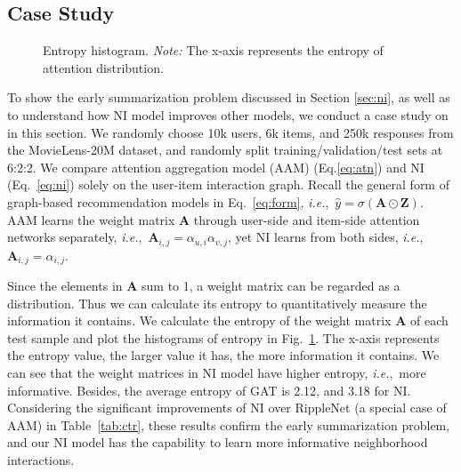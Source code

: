 \documentclass[sigconf]{acmart}
\newcommand{\ie}{\emph{i.e.},~}
\begin{document}
\subsection{Case Study}\label{sec:cs}
\begin{figure}
    \caption{Entropy histogram. \emph{Note:} The x-axis represents the entropy of attention distribution.}
    \label{fig:hist}
\end{figure}


To show the early summarization problem discussed in Section \ref{sec:ni}, as well as to understand how NI model improves other models, 
we conduct a case study on in this section. We randomly choose 10k users, 6k items, and 250k responses from the MovieLens-20M dataset, and randomly split training/validation/test sets at 6:2:2. 
We compare attention aggregation model (AAM) (Eq.\eqref{eq:atn}) and NI (Eq.~\eqref{eq:ni}) solely on the user-item interaction graph. Recall the general form of graph-based recommendation models in Eq.~\eqref{eq:form}, \ie $\hat{y} = \sigma(\mathbf{A} \odot \mathbf{Z})$. 
AAM learns the weight matrix $\mathbf{A}$ through user-side and item-side attention networks separately, \ie $\mathbf{A}_{i,j} = \alpha_{u,i} \alpha_{v,j}$, yet NI learns from both sides, \ie $\mathbf{A}_{i,j} = \alpha_{i,j}$. 

Since the elements in $\mathbf{A}$ sum to 1, a weight matrix can be regarded as a distribution. Thus we can calculate its entropy to quantitatively measure the information it contains. We calculate the entropy of the weight matrix $\mathbf{A}$ of each test sample and plot the histograms of entropy in Fig.~\ref{fig:hist}. The x-axis represents the entropy value, the larger value it has, the more information it contains. 
We can see that the weight matrices in NI model have higher entropy, \ie more informative. Besides, the average entropy of GAT is 2.12, and 3.18 for NI. Considering the significant improvements of NI over RippleNet (a special case of AAM) in Table~\ref{tab:ctr}, these results confirm the early summarization problem, and our NI model has the capability to learn more informative neighborhood interactions.
\end{document}

